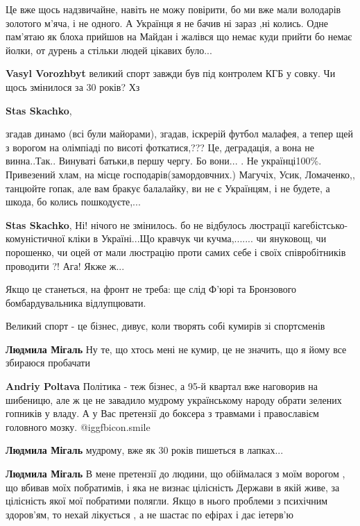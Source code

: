 \begin{itemize}

Це вже щось надзвичайне, навіть не можу повірити, бо ми вже мали володарів
золотого м'яча, і не одного. А Українця я не бачив ні зараз ,ні колись. Одне
пам'ятаю як блоха прийшов на Майдан і жалівся що немає куди прийти бо немає
йолки, от дурень а стільки людей цікавих було...

\begin{itemize} %
\textbf{Vasyl Vorozhbyt} великий спорт завжди був під контролем КГБ у совку. Чи щось змінилося за 30 років? Хз

\textbf{Stas Skachko}, 

згадав динамо (всі були майорами), згадав, іскрерій футбол малафея, а тепер щей
з ворогом на олімпіаді по висоті фоткатися,??? Це, деградація, а вона не
винна..Так.. Винуваті батьки,в першу чергу. Бо вони... . Не українці100\%.
Привезений хлам, на місце господарів(замордовчних.) Магучіх, Усик, Ломаченко,,
танцюйте гопак, але вам бракує балалайку, ви не є Українцям, і не будете, а
шкода, бо колись пошкодуєте,...


\textbf{Stas Skachko}, Ні! нічого не змінилось. бо не відбулось люстрації кагебістсько-комуністичної кліки в Україні...Що кравчук чи кучма,....... чи януковощ, чи порошенко, чи оцей от мали люстрацію проти самих себе і своїх співробітників проводити ?! Ага! Якже ж...
\end{itemize} %

Якщо це станеться, на фронт не треба: ще слід Ф'юрі та Бронзового бомбардувальника відлупцювати.

Великий спорт - це бізнес, дивує, коли творять собі кумирів зі спортсменів

\begin{itemize} %
\textbf{Людмила Мігаль} Ну те, що хтось мені не кумир, це не значить, що я йому все збираюся пробачати

\textbf{Andriy Poltava} Політика - теж бізнес, а 95-й квартал вже наговорив на шибеницю, але ж це не завадило мудрому українському народу обрати зелених гопників у владу. А у Вас претензії до боксера з травмами і православієм головного мозку. @igg{fbicon.smile} 

\textbf{Людмила Мігаль} мудрому, вже як 30 років пишеться в лапках...

\textbf{Людмила Мігаль} В мене претензії до людини, що обіймалася з моїм ворогом , що вбивав моїх побратимів, і яка не визнає цілісність Держави в якій живе, за цілісність якої мої побратими полягли. Якщо в нього проблеми з психічним здоров'ям, то нехай лікується , а не шастає по ефірах і дає іетерв'ю
\end{itemize} %


\end{itemize}
